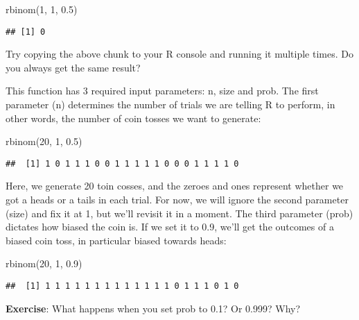 \documentclass[
]{book}
\newenvironment{Shaded}{\begin{snugshade}}{\end{snugshade}}
\newcommand{\DecValTok}[1]{\textcolor[rgb]{0.00,0.00,0.81}{#1}}
\newcommand{\FloatTok}[1]{\textcolor[rgb]{0.00,0.00,0.81}{#1}}
\newcommand{\FunctionTok}[1]{\textcolor[rgb]{0.00,0.00,0.00}{#1}}
\newcommand{\NormalTok}[1]{#1}
\begin{document}
\begin{Shaded}
\begin{Highlighting}[]
\FunctionTok{rbinom}\NormalTok{(}\DecValTok{1}\NormalTok{, }\DecValTok{1}\NormalTok{, }\FloatTok{0.5}\NormalTok{)}
\end{Highlighting}
\end{Shaded}

\begin{verbatim}
## [1] 0
\end{verbatim}

Try copying the above chunk to your R console and running it multiple times. Do you always get the same result?

This function has 3 required input parameters: n, size and prob. The first parameter (n) determines the number of trials we are telling R to perform, in other words, the number of coin tosses we want to generate:

\begin{Shaded}
\begin{Highlighting}[]
\FunctionTok{rbinom}\NormalTok{(}\DecValTok{20}\NormalTok{, }\DecValTok{1}\NormalTok{, }\FloatTok{0.5}\NormalTok{)}
\end{Highlighting}
\end{Shaded}

\begin{verbatim}
##  [1] 1 0 1 1 1 0 0 1 1 1 1 1 0 0 0 1 1 1 1 0
\end{verbatim}

Here, we generate 20 toin cosses, and the zeroes and ones represent whether we got a heads or a tails in each trial. For now, we will ignore the second parameter (size) and fix it at 1, but we'll revisit it in a moment. The third parameter (prob) dictates how biased the coin is. If we set it to 0.9, we'll get the outcomes of a biased coin toss, in particular biased towards heads:

\begin{Shaded}
\begin{Highlighting}[]
\FunctionTok{rbinom}\NormalTok{(}\DecValTok{20}\NormalTok{, }\DecValTok{1}\NormalTok{, }\FloatTok{0.9}\NormalTok{)}
\end{Highlighting}
\end{Shaded}

\begin{verbatim}
##  [1] 1 1 1 1 1 1 1 1 1 1 1 1 1 0 1 1 1 0 1 0
\end{verbatim}

\textbf{Exercise}: What happens when you set prob to 0.1? Or 0.999? Why?
\end{document}
